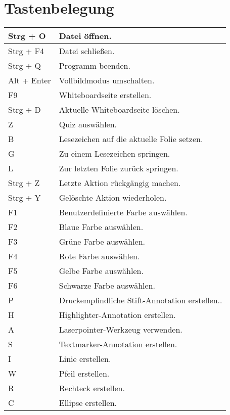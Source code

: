 \pagebreak
\section{Tastenbelegung}
\newcommand{\altKey}{Alt}
\newcommand{\ctrlKey}{Strg}
\newcommand{\shiftKey}{Shift}

\begin{longtable}{|p{}|l|}
	\hline
	{\ctrlKey} + O & Datei öffnen.\\
	\hline
	{\ctrlKey} + F4 & Datei schließen.\\
	\hline
	{\ctrlKey} + Q & Programm beenden.\\
	\hline
	{\altKey} + Enter & Vollbildmodus umschalten.\\
	\hline
	F9 & Whiteboardseite erstellen.\\
	\hline
	{\ctrlKey} + D & Aktuelle Whiteboardseite löschen.\\
	\hline
	Z & Quiz auswählen.\\
	\hline
	B & Lesezeichen auf die aktuelle Folie setzen.\\
	\hline
	G & Zu einem Lesezeichen springen.\\
	\hline
	L & Zur letzten Folie zurück springen.\\
	\hline
	{\ctrlKey} + Z & Letzte Aktion rückgängig machen.\\
	\hline
	{\ctrlKey} + Y & Gelöschte Aktion wiederholen.\\
	\hline
	F1 & Benutzerdefinierte Farbe auswählen.\\
	\hline
	F2 & Blaue Farbe auswählen.\\
	\hline
	F3 & Grüne Farbe auswählen.\\
	\hline
	F4 & Rote Farbe auswählen.\\
	\hline
	F5 & Gelbe Farbe auswählen.\\
	\hline
	F6 & Schwarze Farbe auswählen.\\
	\hline
	P & Druckempfindliche Stift-Annotation erstellen..\\
	\hline
	H & Highlighter-Annotation erstellen.\\
	\hline
	A & Laserpointer-Werkzeug verwenden.\\
	\hline
	S & Textmarker-Annotation erstellen.\\
	\hline
	I & Linie erstellen.\\
	\hline
	W & Pfeil erstellen.\\
	\hline
	R & Rechteck erstellen.\\
	\hline
	C & Ellipse erstellen.\\

\end{longtable}
